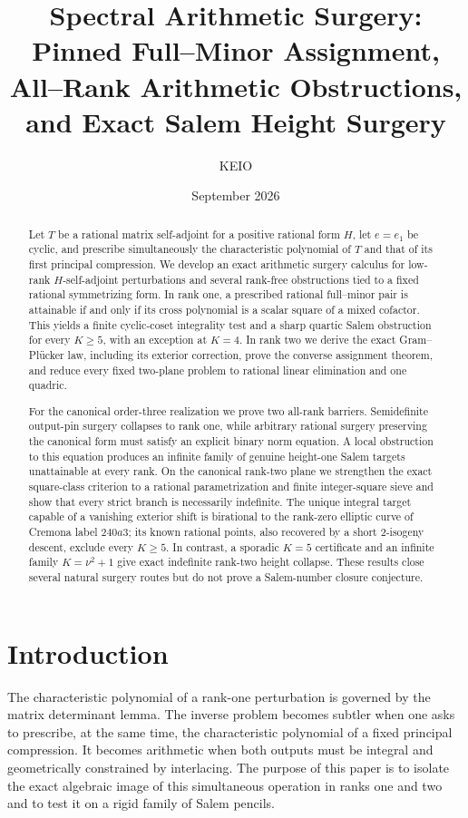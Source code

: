 \documentclass[11pt,reqno]{amsart}
\title[Spectral arithmetic surgery]{Spectral Arithmetic Surgery:\\
Pinned Full--Minor Assignment, All--Rank Arithmetic Obstructions,\\
and Exact Salem Height Surgery}
\author{KEIO}
\date{September 2026}
\theoremstyle{definition}
\theoremstyle{remark}
\begin{document}
\begin{abstract}
Let $T$ be a rational matrix self-adjoint for a positive rational form $H$,
let $e=e_1$ be cyclic, and prescribe simultaneously the characteristic
polynomial of $T$ and that of its first principal compression.  We develop an
exact arithmetic surgery calculus for low-rank $H$-self-adjoint
perturbations and several rank-free obstructions tied to a fixed rational
symmetrizing form.  In rank one, a prescribed rational full--minor pair is
attainable if and only if its cross polynomial is a scalar square of a mixed
cofactor.  This yields a finite cyclic-coset integrality test and a sharp
quartic Salem obstruction for every $K\geq5$, with an exception at $K=4$.
In rank two we derive the exact Gram--Pl\"ucker law, including its exterior
correction, prove the converse assignment theorem, and reduce every fixed
two-plane problem to rational linear elimination and one quadric.

For the canonical order-three realization we prove two all-rank barriers.
Semidefinite output-pin surgery collapses to rank one, while arbitrary
rational surgery preserving the canonical form must satisfy an explicit
binary norm equation.  A local obstruction to this equation produces an
infinite family of genuine height-one Salem targets unattainable at every
rank.  On the canonical rank-two plane we strengthen the exact square-class
criterion to a rational parametrization and finite integer-square sieve and
show that every strict branch is necessarily indefinite.  The unique
integral target capable of a vanishing exterior shift is birational to the
rank-zero elliptic curve of Cremona label $240a3$; its known rational points,
also recovered by a short $2$-isogeny descent, exclude every $K\geq5$.
In contrast, a sporadic $K=5$ certificate and an infinite family
$K=\nu^2+1$ give exact indefinite rank-two height collapse.  These results
close several natural surgery routes but do not prove a Salem-number closure
conjecture.
\end{abstract}

\maketitle

\section{Introduction}

The characteristic polynomial of a rank-one perturbation is governed by the
matrix determinant lemma.  The inverse problem becomes subtler when one asks
to prescribe, at the same time, the characteristic polynomial of a fixed
principal compression.  It becomes arithmetic when both outputs must be
integral and geometrically constrained by interlacing.  The purpose of this
paper is to isolate the exact algebraic image of this simultaneous operation
in ranks one and two and to test it on a rigid family of Salem pencils.
\end{document}
